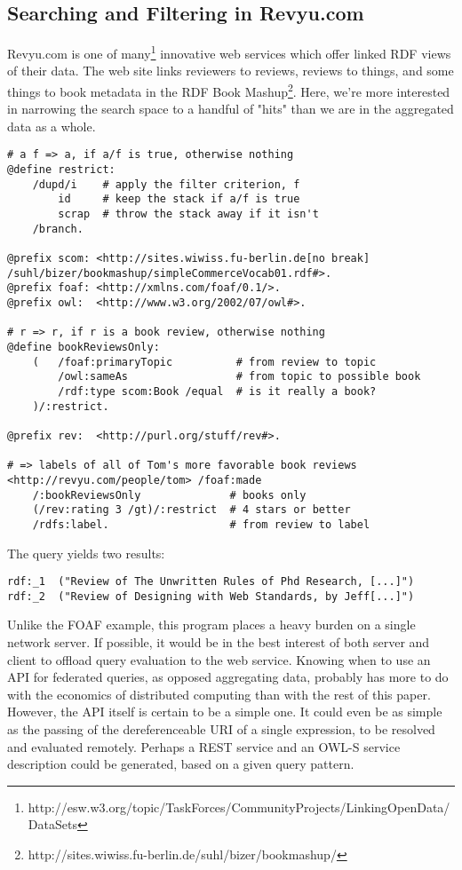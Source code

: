 \documentclass[runningheads]{llncs}
\begin{document}
\subsection{Searching and Filtering in Revyu.com}
Revyu.com is one of many\footnote{http://esw.w3.org/topic/TaskForces/CommunityProjects/LinkingOpenData/DataSets} innovative web services which offer linked RDF views of their data.  The web site links reviewers to reviews, reviews to things, and some things to book metadata in the RDF Book Mashup\footnote{http://sites.wiwiss.fu-berlin.de/suhl/bizer/bookmashup/}.  Here, we're 
more interested in narrowing the search space to a handful of "hits" than we are in the aggregated data as a whole.
\begin{verbatim}
# a f => a, if a/f is true, otherwise nothing
@define restrict:
    /dupd/i    # apply the filter criterion, f
        id     # keep the stack if a/f is true
        scrap  # throw the stack away if it isn't
    /branch.

@prefix scom: <http://sites.wiwiss.fu-berlin.de[no break]
/suhl/bizer/bookmashup/simpleCommerceVocab01.rdf#>.
@prefix foaf: <http://xmlns.com/foaf/0.1/>.
@prefix owl:  <http://www.w3.org/2002/07/owl#>.

# r => r, if r is a book review, otherwise nothing
@define bookReviewsOnly:
    (   /foaf:primaryTopic          # from review to topic
        /owl:sameAs                 # from topic to possible book
        /rdf:type scom:Book /equal  # is it really a book?
    )/:restrict.

@prefix rev:  <http://purl.org/stuff/rev#>.

# => labels of all of Tom's more favorable book reviews
<http://revyu.com/people/tom> /foaf:made
    /:bookReviewsOnly              # books only
    (/rev:rating 3 /gt)/:restrict  # 4 stars or better
    /rdfs:label.                   # from review to label
\end{verbatim}

The query yields two results:
\begin{verbatim}
rdf:_1  ("Review of The Unwritten Rules of Phd Research, [...]")
rdf:_2  ("Review of Designing with Web Standards, by Jeff[...]")
\end{verbatim}

Unlike the FOAF example, this program places a heavy burden on a single network server.  If possible, it would be in the best interest of both server and client to offload query evaluation to the web service.  Knowing when to use an API for federated queries, as opposed aggregating data, probably has more to do with the economics of distributed computing than with the rest of this paper.  However, the API itself is certain to be a simple one.  It could even be as simple as the passing of the dereferenceable URI of a single expression, to be resolved and evaluated remotely.  Perhaps a REST service and an OWL-S service description could be generated, based on a given query pattern.
\end{document}
